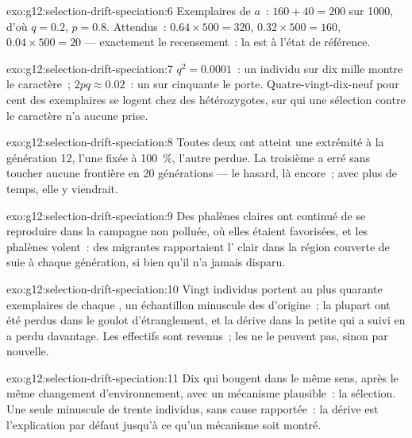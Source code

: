 \begin{solution}{exo:g12:selection-drift-speciation:6}
Exemplaires de $a$~: $160 + 40 = 200$ sur 1000, d'où $q = 0.2$,
$p = 0.8$. Attendus~: $0.64 \times 500 = 320$, $0.32 \times 500 = 160$,
$0.04
\times 500 = 20$ --- exactement le recensement~: la  est à
l'état de référence.
\end{solution}

\begin{solution}{exo:g12:selection-drift-speciation:7}
$q^2 = 0.0001$~: un individu sur dix mille montre le caractère~;
$2pq \approx
0.02$~: un sur cinquante le porte. Quatre-vingt-dix-neuf pour cent des
exemplaires se logent chez des hétérozygotes, sur qui une sélection
contre le caractère n'a aucune prise.
\end{solution}

\begin{solution}{exo:g12:selection-drift-speciation:8}
Toutes deux ont atteint une extrémité à la génération 12, l'une fixée à
100~\%, l'autre perdue. La troisième a erré sans toucher aucune
frontière en 20 générations --- le hasard, là encore~; avec plus de
temps, elle y viendrait.
\end{solution}

\begin{solution}{exo:g12:selection-drift-speciation:9}
Des phalènes claires ont continué de se reproduire dans la campagne non
polluée, où elles étaient favorisées, et les phalènes volent~: des
migrantes rapportaient l' clair dans la région couverte de suie à
chaque génération, si bien qu'il n'a jamais disparu.
\end{solution}

\begin{solution}{exo:g12:selection-drift-speciation:10}
Vingt individus portent au plus quarante exemplaires de chaque , un
échantillon minuscule des  d'origine~; la plupart ont été perdus
dans le goulot d'étranglement, et la dérive dans la petite 
qui a suivi en a perdu davantage. Les effectifs sont revenus~; les
 ne le peuvent pas, sinon par  nouvelle.
\end{solution}

\begin{solution}{exo:g12:selection-drift-speciation:11}
Dix  qui bougent dans le même sens, après le même changement
d'environnement, avec un mécanisme plausible~: la sélection. Une seule
 minuscule de trente individus, sans cause rapportée~: la
dérive est l'explication par défaut jusqu'à ce qu'un mécanisme soit
montré.
\end{solution}

